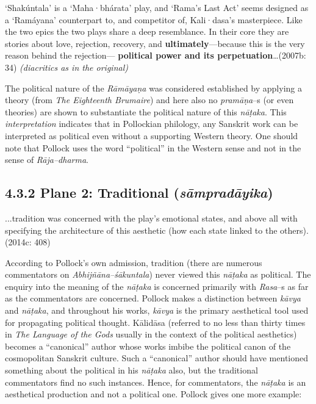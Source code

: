 \begin{myquote}
‘Shakúntala’ is a ‘Maha·bhárata’ play, and ‘Rama’s Last Act’ seems designed as a ‘Ramáyana’ counterpart to, and competitor of, Kali·dasa’s masterpiece. Like the two epics the two plays share a deep resemblance. In their core they are stories about love, rejection, recovery, and \textbf{ultimately}—because this is the very reason behind the rejection— \textbf{political power and its perpetuation}…(2007b: 34) \textit{(diacritics as in the original)}
\end{myquote}

The political nature of the \textit{Rāmāyaṇa }was considered established by applying a theory (from\textit{ The Eighteenth Brumaire}) and here also no \textit{pramāṇa}–s (or even theories) are shown to substantiate the political nature of this \textit{nāṭaka}. This \textit{interpretation} indicates that in Pollockian philology, any Sanskrit work can be interpreted as political even without a supporting Western theory. One should note that Pollock uses the word “political” in the Western sense and not in the sense of \textit{Rāja–dharma}.

\newpage

\subsection*{4.3.2 Plane 2: Traditional ({\it {\bfseries sāmpradāyika}})}

\vspace{-.4cm}

\begin{myquote}
...tradition was concerned with the play’s emotional states, and above all with specifying the architecture of this aesthetic (how each state linked to the others). (2014c: 408)
\end{myquote}

According to Pollock’s own admission, tradition (there are numerous commentators on \textit{Abhijñāna–śākuntala}) never viewed this \textit{nāṭaka }as political. The enquiry into the meaning of the \textit{nāṭaka }is concerned primarily with \textit{Rasa}–s as far as the commentators are concerned. Pollock makes a distinction between \textit{kāvya} and \textit{nāṭaka}, and throughout his works,\textit{ kāvya }is the primary aesthetical tool used for propagating political thought. Kālidāsa (referred to no less than thirty times in \textit{The Language of the Gods} usually in the context of the political aesthetics) becomes a “canonical” author whose works imbibe the political canon of the cosmopolitan Sanskrit culture. Such a “canonical” author should have mentioned something about the political in his \textit{nāṭaka }also, but the traditional commentators find no such instances. Hence, for commentators, the \textit{nāṭaka }is an aesthetical production and not a political one. Pollock gives one more example:

